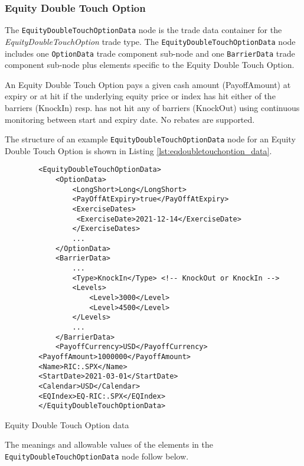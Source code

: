 \subsubsection{Equity Double Touch Option}

The \lstinline!EquityDoubleTouchOptionData!  node is the trade data container for the \emph{EquityDoubleTouchOption} trade type.   The
\lstinline!EquityDoubleTouchOptionData!  node includes one  \lstinline!OptionData! trade component sub-node and one \lstinline!BarrierData! trade component sub-node plus elements
specific to the Equity Double Touch Option. 

An Equity Double Touch Option pays a given cash amount (PayoffAmount) at expiry or at hit if the underlying equity price or index has hit either of the barriers (KnockIn) resp. has not hit any of barriers (KnockOut) using continuous monitoring between start and expiry date. No rebates are supported. 

The structure of an example \lstinline!EquityDoubleTouchOptionData! node for an Equity Double Touch Option is shown in Listing
\ref{lst:eqdoubletouchoption_data}.

\begin{listing}[H]
\begin{verbatim}
        <EquityDoubleTouchOptionData>
            <OptionData>
                <LongShort>Long</LongShort>
                <PayOffAtExpiry>true</PayOffAtExpiry>
                <ExerciseDates>
                 <ExerciseDate>2021-12-14</ExerciseDate>
                </ExerciseDates>                     
                ...
            </OptionData>
            <BarrierData>
                ...
                <Type>KnockIn</Type> <!-- KnockOut or KnockIn -->
                <Levels>
                    <Level>3000</Level>
                    <Level>4500</Level>
                </Levels>
                ...
            </BarrierData>
            <PayoffCurrency>USD</PayoffCurrency>
	    <PayoffAmount>1000000</PayoffAmount>
	    <Name>RIC:.SPX</Name>
	    <StartDate>2021-03-01</StartDate>
	    <Calendar>USD</Calendar>
	    <EQIndex>EQ-RIC:.SPX</EQIndex>
        </EquityDoubleTouchOptionData>
\end{verbatim}
\caption{Equity Double Touch Option data}
\label{lst:eqdoubletouchoption_data}
\end{listing}

The meanings and allowable values of the elements in the \lstinline!EquityDoubleTouchOptionData!  node follow below.

